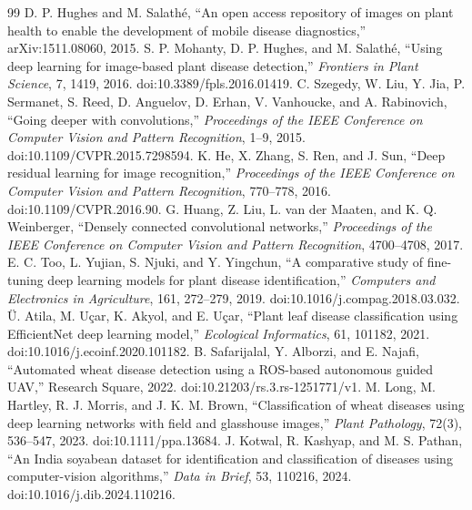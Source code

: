 \documentclass[a4paper,fleqn]{cas-dc}
\begin{document}
\begin{thebibliography}{99}
 D. P. Hughes and M. Salathé, ``An open access repository of images on plant health to enable the development of mobile disease diagnostics,'' arXiv:1511.08060, 2015.
 S. P. Mohanty, D. P. Hughes, and M. Salathé, ``Using deep learning for image-based plant disease detection,'' \textit{Frontiers in Plant Science}, 7, 1419, 2016. doi:10.3389/fpls.2016.01419.
 C. Szegedy, W. Liu, Y. Jia, P. Sermanet, S. Reed, D. Anguelov, D. Erhan, V. Vanhoucke, and A. Rabinovich, ``Going deeper with convolutions,'' \textit{Proceedings of the IEEE Conference on Computer Vision and Pattern Recognition}, 1--9, 2015. doi:10.1109/CVPR.2015.7298594.
 K. He, X. Zhang, S. Ren, and J. Sun, ``Deep residual learning for image recognition,'' \textit{Proceedings of the IEEE Conference on Computer Vision and Pattern Recognition}, 770--778, 2016. doi:10.1109/CVPR.2016.90.
 G. Huang, Z. Liu, L. van der Maaten, and K. Q. Weinberger, ``Densely connected convolutional networks,'' \textit{Proceedings of the IEEE Conference on Computer Vision and Pattern Recognition}, 4700--4708, 2017.
 E. C. Too, L. Yujian, S. Njuki, and Y. Yingchun, ``A comparative study of fine-tuning deep learning models for plant disease identification,'' \textit{Computers and Electronics in Agriculture}, 161, 272--279, 2019. doi:10.1016/j.compag.2018.03.032.
 Ü. Atila, M. Uçar, K. Akyol, and E. Uçar, ``Plant leaf disease classification using EfficientNet deep learning model,'' \textit{Ecological Informatics}, 61, 101182, 2021. doi:10.1016/j.ecoinf.2020.101182.
 B. Safarijalal, Y. Alborzi, and E. Najafi, ``Automated wheat disease detection using a ROS-based autonomous guided UAV,'' Research Square, 2022. doi:10.21203/rs.3.rs-1251771/v1.
 M. Long, M. Hartley, R. J. Morris, and J. K. M. Brown, ``Classification of wheat diseases using deep learning networks with field and glasshouse images,'' \textit{Plant Pathology}, 72(3), 536--547, 2023. doi:10.1111/ppa.13684.
 J. Kotwal, R. Kashyap, and M. S. Pathan, ``An India soyabean dataset for identification and classification of diseases using computer-vision algorithms,'' \textit{Data in Brief}, 53, 110216, 2024. doi:10.1016/j.dib.2024.110216.

\end{thebibliography}
\end{document}
